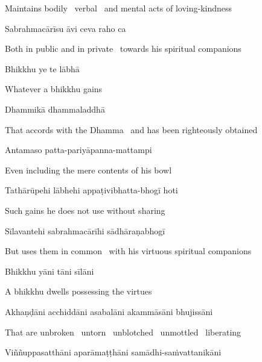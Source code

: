\begin{english-hang}
  Maintains bodily \breathmark\ verbal \breathmark\ and mental acts of loving-kindness
\end{english-hang}

Sabrahmacārīsu āvi ceva raho ca

\begin{english}
  Both in public and in private \breathmark\ towards his spiritual companions
\end{english}

Bhikkhu ye te lābhā

\begin{english}
  Whatever a bhikkhu gains
\end{english}

Dhammikā dhammaladdhā

\begin{english}
  That accords with the Dhamma \breathmark\ and has been righteously obtained
\end{english}

Antamaso patta-pariyāpanna-mattampi

\begin{english}
  Even including the mere contents of his bowl
\end{english}

Tathārūpehi lābhehi appaṭivibhatta-bhogī hoti

\begin{english}
  Such gains he does not use without sharing
\end{english}

Sīlavantehi sabrahmacārīhi sādhāraṇabhogī

\begin{english}
  But uses them in common \breathmark\ with his virtuous spiritual companions
\end{english}

Bhikkhu yāni tāni sīlāni

\begin{english}
  A bhikkhu dwells possessing the virtues
\end{english}

Akhaṇḍāni acchiddāni asabalāni akammāsāni bhujissāni

\begin{english}
  That are unbroken \breathmark\ untorn \breathmark\ unblotched \breathmark\ unmottled \breathmark\ liberating
\end{english}

Viññuppasatthāni aparāmaṭṭhāni samādhi-saṁvattanikāni

